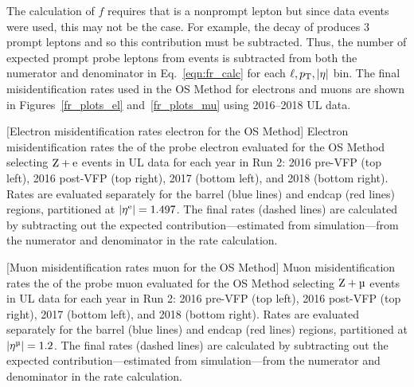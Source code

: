 The calculation of $f$ requires that \looselep is a nonprompt lepton but since data events were used, this may not be the case.
For example, the decay of \WZ produces 3 prompt leptons and so this contribution must be subtracted.
Thus, the number of expected prompt probe leptons from \WZ events is subtracted from both the numerator and denominator in Eq.~\ref{eqn:fr_calc} for each $\ell, p_{\mathrm{T}}, \lvert \eta \rvert$ bin.
The final misidentification rates used in the OS Method for electrons and muons are shown in Figures~\ref{fr_plots_el} and~\ref{fr_plots_mu} using 2016--2018 UL data.
\begin{multiFigure}
	\centering
		[Electron misidentification rates \vs electron \pt for the OS Method]
		{Electron misidentification rates \vs the \pt of the probe electron evaluated for the OS Method selecting $\text{Z} + \mathrm{e}$ events in UL data
		for each year in Run 2:
		2016 pre-VFP (top left),
		2016 post-VFP (top right),
		2017 (bottom left), and
		2018 (bottom right).
		Rates are evaluated separately for the barrel (blue lines) and endcap (red lines) regions,
		partitioned at $\lvert \eta^{\mathrm{e}} \rvert = 1.497$.
		The final rates (dashed lines) are calculated by subtracting out the expected \WZ contribution---estimated from simulation---from the numerator and denominator in the rate calculation.}
	\label{fr_plots_el}
\end{multiFigure}
\begin{multiFigure}
	\centering
		[Muon misidentification rates \vs muon \pt for the OS Method]
		{Muon misidentification rates \vs the \pt of the probe muon evaluated for the OS Method selecting $\PZ + \Pmu$ events in UL data
		for each year in Run 2:
		2016 pre-VFP (top left),
		2016 post-VFP (top right),
		2017 (bottom left), and
		2018 (bottom right).
		Rates are evaluated separately for the barrel (blue lines) and endcap (red lines) regions,
		partitioned at $\abs{\eta^{\Pmu}} = 1.2$.
		The final rates (dashed lines) are calculated by subtracting out the expected \WZ contribution---estimated from simulation---from the numerator and denominator in the rate calculation.}
	\label{fr_plots_mu}
\end{multiFigure}

